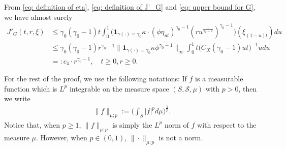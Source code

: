 \documentclass[12pt,a4paper]{amsart}
\theoremstyle{definition}
\numberwithin{equation}{section}
\begin{document}
From \eqref{eq: definition of eta}, \eqref{eq: definition of J'_G} and \eqref{eq: upper bound for G}, we have almost surely
\begin{align}\label{eq: upper bound for J'_G}
	J'_G(t,r,\xi)
	& \leq \gamma_0 (\gamma_0 - 1) t \int_0^1 \big( \mathbf 1_{\gamma(\cdot) = \gamma_0} \kappa \cdot (\phi \eta_{ut})^{\gamma_0 - 1} (ru^{\frac{1}{\gamma_0 - 1}})^{\gamma_0 - 1}\big) (\xi_{(1-u)t}) du
	\\ &\leq \gamma_0(\gamma_0 - 1) r^{\gamma_0 - 1} \big\|   \mathbf 1_{\gamma(\cdot) = \gamma_0}  \kappa \phi^{\gamma_0 - 1} \big\|_\infty \int_0^1 t \big(  C_X(\gamma_0 - 1) ut \big)^{- 1}  u  du
	\\ &=: c_4 \cdot r^{\gamma_0 - 1},
       \quad t\geq 0, r\geq 0.
\end{align}

For the rest of the proof, we use the following notations:
If $f$ is a measurable function which is $L^p$ integrable on the measure space $(S,\mathscr S,\mu)$ with $p > 0$, then we write
\begin{align}
	\|f\|_{\mu;p}
	:= \Big(\int_{S} |f|^p d\mu \Big)^{\frac{1}{p}}.
\end{align}
Notice that, when $p\geq 1$, $\|f\|_{\mu;p}$ is simply the $L^p$ norm of $f$ with respect to the measure $\mu$.	
However, when $p \in (0,1)$, $\|\cdot\|_{\mu; p}$ is not a norm.
\end{document}
